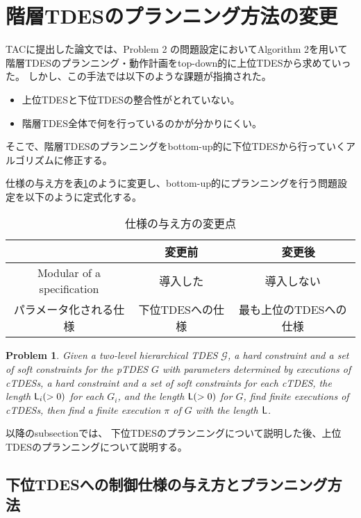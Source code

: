 \documentclass[ 10pt]{jsarticle}
\newtheorem{pbm}{Problem}
\newcommand{\rsec}[1]{Section\,\ref{#1}}
\newcommand{\tick}{{\sf tick}}
\newcommand{\Len}{{\sf L}}
\begin{document}
%
\section{階層TDESのプランニング方法の変更}
TACに提出した論文では、Problem 2 の問題設定においてAlgorithm 2を用いて階層TDESのプランニング・動作計画をtop-down的に上位TDESから求めていった。
しかし、この手法では以下のような課題が指摘された。
\begin{itemize}
\item
上位TDESと下位TDESの整合性がとれていない。
\item
階層TDES全体で何を行っているのかが分かりにくい。
\end{itemize}
そこで、階層TDESのプランニングをbottom-up的に下位TDESから行っていくアルゴリズムに修正する。

仕様の与え方を表\ref{spec}のように変更し、bottom-up的にプランニングを行う問題設定を以下のように定式化する。
%
\begin{table}[tb]
\centering
\caption{仕様の与え方の変更点}
\label{spec}
\begin{tabular}{c||c|c}
 &変更前　&　変更後　\\\hline\hline
Modular of a specification&導入した&導入しない\\\hline
パラメータ化される仕様 &下位TDESへの仕様&最も上位のTDESへの仕様
\end{tabular}
\end{table}
%
\begin{pbm}\label{pbm3}
Given a two-level hierarchical TDES $\mathcal{G}$, a hard constraint and a set of soft constraints for the pTDES $G$ with parameters determined by executions of cTDESs, a  hard constraint and a set of soft constraints for each cTDES, the length $\Len_i(>0)$ for each $G_i$, and the length $\Len(>0)$ for $G$, find finite executions of cTDESs, then find a finite execution $\pi$ of $G$ with the length $\Len$.
%
\end{pbm}
%
以降のsubsectionでは、
下位TDESのプランニングについて説明した後、上位TDESのプランニングについて説明する。
%
\subsection{下位TDESへの制御仕様の与え方とプランニング方法}
%
%

\end{document}

